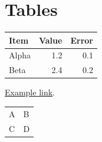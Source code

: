 \documentclass[11pt]{article}
\begin{document}
\section{Tables}\begin{tabular}{lrr}\toprule Item&Value&Error\\\midrule Alpha&1.2&0.1\\Beta&2.4&0.2\\\bottomrule\end{tabular}\par\href{https://example.org}{Example link}.\begin{longtable}{ll}A&B\\C&D\\\end{longtable}
\end{document}
